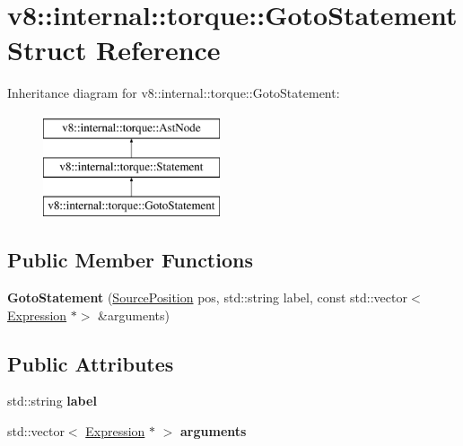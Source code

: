 \hypertarget{structv8_1_1internal_1_1torque_1_1GotoStatement}{}\section{v8\+:\+:internal\+:\+:torque\+:\+:Goto\+Statement Struct Reference}
\label{structv8_1_1internal_1_1torque_1_1GotoStatement}
Inheritance diagram for v8\+:\+:internal\+:\+:torque\+:\+:Goto\+Statement\+:\begin{figure}[H]
\begin{center}
\leavevmode
\includegraphics[height=3.000000cm]{structv8_1_1internal_1_1torque_1_1GotoStatement}
\end{center}
\end{figure}
\subsection*{Public Member Functions}
\begin{DoxyCompactItemize}
\item 
\mbox{\label{structv8_1_1internal_1_1torque_1_1GotoStatement_a279d27877dfd99a94352251b6d7a8592}} 
{\bfseries Goto\+Statement} (\mbox{\hyperlink{structv8_1_1internal_1_1torque_1_1SourcePosition}{Source\+Position}} pos, std\+::string label, const std\+::vector$<$ \mbox{\hyperlink{structv8_1_1internal_1_1torque_1_1Expression}{Expression}} $\ast$$>$ \&arguments)
\end{DoxyCompactItemize}
\subsection*{Public Attributes}
\begin{DoxyCompactItemize}
\item 
\mbox{\label{structv8_1_1internal_1_1torque_1_1GotoStatement_a48c08d2855f2f56934e78ab18829c4ff}} 
std\+::string {\bfseries label}
\item 
\mbox{\label{structv8_1_1internal_1_1torque_1_1GotoStatement_ad7d2583673361138f695da4279145d46}} 
std\+::vector$<$ \mbox{\hyperlink{structv8_1_1internal_1_1torque_1_1Expression}{Expression}} $\ast$ $>$ {\bfseries arguments}
\end{DoxyCompactItemize}
